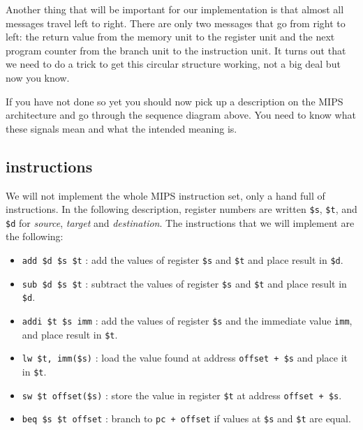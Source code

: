 \documentclass[a4paper,11pt]{article}
\begin{document}
Another thing that will be important for our implementation is that
almost all messages travel left to right. There are only two messages
that go from right to left: the return value from the memory unit to
the register unit and the next program counter from the branch unit to
the instruction unit. It turns out that we need to do a trick to get
this circular structure working, not a big deal but now you know.

If you have not done so yet you should now pick up a description on
the MIPS architecture and go through the sequence diagram above. You
need to know what these signals mean and what the intended meaning is.

\subsection{instructions}

We will not implement the whole MIPS instruction set, only a hand full
of instructions. In the following description, register numbers are
written {\tt \$s}, {\tt \$t}, and {\tt \$d} for {\em source}, {\em
  target} and {\em destination}.  The instructions that we will
implement are the following:

\begin{itemize}

\item {\tt add \$d \$s \$t} : add the values of register {\tt \$s} and {\tt \$t} and place result in {\tt \$d}.

\item {\tt sub \$d \$s \$t} : subtract the values of register {\tt \$s} and {\tt \$t} and place result in {\tt \$d}.  

\item {\tt addi \$t \$s imm} : add the values of register {\tt \$s} and the immediate value {\tt imm}, and place result in {\tt \$t}.

\item {\tt lw \$t, imm(\$s)} : load the value found at address {\tt offset + \$s} and place it in {\tt \$t}.

\item {\tt sw \$t offset(\$s)} : store the value in register {\tt \$t} at address {\tt offset + \$s}. 

\item {\tt beq \$s \$t offset} : branch to {\tt pc + offset} if values at {\tt \$s} and  {\tt \$t} are equal.

\end{itemize}
\end{document}
